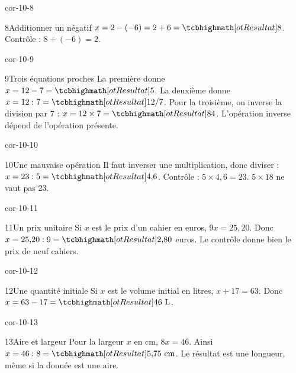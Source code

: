 \begin{blocLivre}{cor-10-8}\begin{corrige}{8}{Additionner un négatif}
$x=2-(-6)=2+6=\res8$. Contrôle : $8+(-6)=2$.
\end{corrige}\end{blocLivre}
\begin{blocLivre}{cor-10-9}\begin{corrige}{9}{Trois équations proches}
La première donne $x=12-7=\res5$. La deuxième donne $x=12:7=\res{12/7}$. Pour la troisième, on inverse la division par 7 : $x=12\times7=\res{84}$. L’opération inverse dépend de l’opération présente.
\end{corrige}\end{blocLivre}
\begin{blocLivre}{cor-10-10}\begin{corrige}{10}{Une mauvaise opération}
Il faut inverser une multiplication, donc diviser : $x=23:5=\res{4{,}6}$. Contrôle : $5\times4{,}6=23$. $5\times18$ ne vaut pas 23.
\end{corrige}\end{blocLivre}
\begin{blocLivre}{cor-10-11}\begin{corrige}{11}{Un prix unitaire}
Si $x$ est le prix d’un cahier en euros, $9x=25{,}20$. Donc $x=25{,}20:9=\res{2{,}80}$ euros. Le contrôle donne bien le prix de neuf cahiers.
\end{corrige}\end{blocLivre}
\begin{blocLivre}{cor-10-12}\begin{corrige}{12}{Une quantité initiale}
Si $x$ est le volume initial en litres, $x+17=63$. Donc $x=63-17=\res{46\ \mathrm L}$.
\end{corrige}\end{blocLivre}
\begin{blocLivre}{cor-10-13}\begin{corrige}{13}{Aire et largeur}
Pour la largeur $x$ en cm, $8x=46$. Ainsi $x=46:8=\res{5{,}75\ \mathrm{cm}}$. Le résultat est une longueur, même si la donnée est une aire.
\label{fig-cor-10-13}
\end{corrige}\end{blocLivre}
